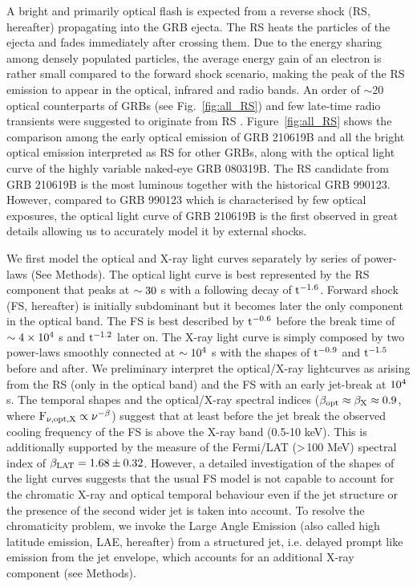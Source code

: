 \documentclass{naturesubmissionstyle}
\begin{document}
A bright and primarily optical flash is expected from a reverse shock (RS, hereafter) propagating into the GRB ejecta\cite{Meszaros1997,Sari1999,Kobayashi2000}. The RS heats the particles of the ejecta and %
fades immediately after crossing them.
Due to the energy sharing among 
densely populated particles, the average energy gain of an electron is rather small compared to the forward shock scenario, making the peak of the RS emission to appear in the optical, infrared and radio bands. An order of $\sim 20$ optical counterparts of GRBs (see Fig.~\ref{fig:all_RS}) and few late-time radio transients were suggested to originate from RS \cite{Laskar2013,Laskar2019a,Laskar2019b}. 
Figure~\ref{fig:all_RS} shows the comparison among the early optical emission of GRB 210619B and all the bright optical 
emission interpreted as RS for other GRBs, along with the optical light curve of the highly variable naked-eye GRB 080319B\cite{Racusin2008,Beskin2010}. 
The RS candidate from GRB 210619B is the most luminous together with the historical GRB 990123\cite{Akerlof1999}. However, compared to GRB 990123 which is characterised by few optical exposures, the optical light curve of GRB 210619B is the first observed in great details allowing us to accurately model it by external shocks.

We first model the optical and X-ray light curves separately by series of power-laws (See Methods). The optical light curve is best represented by the RS component that peaks at $\rm \sim 30$ s with a following decay of $\rm t^{-1.6}$. Forward shock (FS, hereafter) is initially subdominant but it becomes later the only component in the optical band. The FS is best described by $\rm t^{-0.6}$ before the break time of $\rm \sim 4 \times 10^{4}$ s and $\rm t^{-1.2}$ later on.
The X-ray light curve is simply composed by two power-laws smoothly connected at $\rm \sim 10^{4}$ s with the shapes of $\rm t^{-0.9}$ and $\rm t^{-1.5}$ before and after. We preliminary interpret the optical/X-ray lightcurves as arising from the RS (only in the optical band) and the FS with an early jet-break at $\rm 10^{4}$ s. The temporal shapes and the optical/X-ray spectral indices ($\rm \beta_{opt} \approx \beta_{X} \approx 0.9$, where $\rm F_{\nu,opt,X} \propto \nu^{-\beta}$) suggest that at least before the jet break the observed cooling frequency of the FS is above the X-ray band (0.5-10 keV). This is additionally supported by the measure of the Fermi/LAT ($\rm >$100 MeV) spectral index of $\rm \beta_{LAT}=1.68 \pm 0.32$. However, a detailed investigation of the shapes of the light curves suggests that the usual FS model\cite{Paczynski1993,Meszaros1997,Sari1998} is not capable to account for the chromatic X-ray and optical temporal behaviour even if the jet structure\cite{Dai2001,Lipunov2001,Rossi2002} or the presence of the second wider jet\cite{Kumar2000a,RR2002,Peng2005} is taken into account. To resolve the chromaticity problem, we invoke the Large Angle Emission (also called high latitude emission, LAE, hereafter) from a structured jet, i.e. delayed prompt like emission from the jet envelope\cite{Oganesyan2020,Panaitescu2020}, which accounts for an additional X-ray component (see Methods).   
\end{document}
